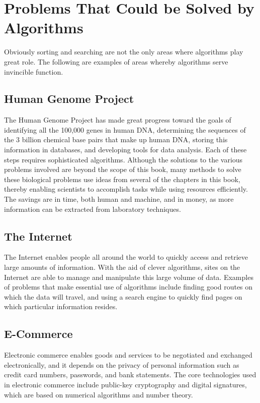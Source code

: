 \documentclass[12pt,a4paper]{book}
\begin{document}
\section{Problems That Could be Solved by Algorithms}
Obviously sorting and searching are not the only areas where algorithms play great role. The following are examples of areas whereby algorithms serve invincible function.
\subsection{Human Genome Project}
The Human Genome Project has made great progress toward the goals of identifying all the 100,000 genes in human DNA, determining the sequences of the 3 billion chemical base pairs that make up human DNA, storing this information in databases, and developing tools for data analysis. Each of these steps requires sophisticated algorithms. Although the solutions to the various problems involved are beyond the scope of this book, many methods to solve these biological problems use ideas from several of the chapters in this book, thereby enabling scientists to accomplish tasks while using resources efficiently. The savings are in time, both human and machine, and in money, as more information can be extracted from laboratory techniques.
\subsection{The Internet}
The Internet enables people all around the world to quickly access and retrieve large amounts of information. With the aid of clever algorithms, sites on the Internet are able to manage and manipulate this large volume of data. Examples of problems that make essential use of algorithms include finding good routes on which the data will travel, and using a search engine to quickly find pages on which particular information resides.
\subsection{E-Commerce}
Electronic commerce enables goods and services to be negotiated and exchanged electronically, and it depends on the privacy of personal information such as credit card numbers, passwords, and bank statements. The core technologies used in electronic commerce include public-key cryptography and digital signatures, which are based on numerical algorithms and number theory.
\end{document}

